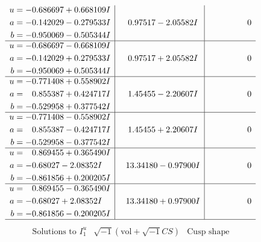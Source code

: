 \documentclass[1p]{elsarticle_modified}
\theoremstyle{definition}
\newcommand{\I}{\sqrt{-1}}
\begin{document}
$$\begin{array}{c|c|c}
\begin{aligned}
u &= -0.686697 + 0.668109 I \\
a &= -0.142029 - 0.279533 I \\
b &= -0.950069 - 0.505344 I\end{aligned}
 & \phantom{-}0.97517 - 2.05582 I & \phantom{-0.000000 } 0 \\ \hline\begin{aligned}
u &= -0.686697 - 0.668109 I \\
a &= -0.142029 + 0.279533 I \\
b &= -0.950069 + 0.505344 I\end{aligned}
 & \phantom{-}0.97517 + 2.05582 I & \phantom{-0.000000 } 0 \\ \hline\begin{aligned}
u &= -0.771408 + 0.558902 I \\
a &= \phantom{-}0.855387 + 0.424717 I \\
b &= -0.529958 + 0.377542 I\end{aligned}
 & \phantom{-}1.45455 - 2.20607 I & \phantom{-0.000000 } 0 \\ \hline\begin{aligned}
u &= -0.771408 - 0.558902 I \\
a &= \phantom{-}0.855387 - 0.424717 I \\
b &= -0.529958 - 0.377542 I\end{aligned}
 & \phantom{-}1.45455 + 2.20607 I & \phantom{-0.000000 } 0 \\ \hline\begin{aligned}
u &= \phantom{-}0.869455 + 0.365490 I \\
a &= -0.68027 - 2.08352 I \\
b &= -0.861856 + 0.200205 I\end{aligned}
 & \phantom{-}13.34180 - 0.97900 I & \phantom{-0.000000 } 0 \\ \hline\begin{aligned}
u &= \phantom{-}0.869455 - 0.365490 I \\
a &= -0.68027 + 2.08352 I \\
b &= -0.861856 - 0.200205 I\end{aligned}
 & \phantom{-}13.34180 + 0.97900 I & \phantom{-0.000000 } 0\\
 \hline 
 \end{array}$$\newpage$$\begin{array}{c|c|c}  
\text{Solutions to }I^u_{1}& \I (\text{vol} + \sqrt{-1}CS) & \text{Cusp shape}\\
 \hline 
\begin{aligned}

\end{aligned}
\end{array}$$
\end{document}
